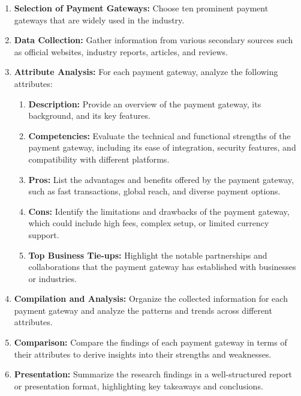 \begin{enumerate}
    \item\textbf{Selection of Payment Gateways:} Choose ten prominent payment gateways that are widely used in the industry.
    
    \item\textbf{Data Collection:} Gather information from various secondary sources such as official websites, industry reports, articles, and reviews.
    
    \item\textbf{Attribute Analysis:} For each payment gateway, analyze the following attributes:
    \begin{enumerate}
        \item\textbf{Description:} Provide an overview of the payment gateway, its background, and its key features.
        
        \item\textbf{Competencies:} Evaluate the technical and functional strengths of the payment gateway, including its ease of integration, security features, and compatibility with different platforms.
        
        \item\textbf{Pros:} List the advantages and benefits offered by the payment gateway, such as fast transactions, global reach, and diverse payment options.
        
        \item\textbf{Cons:} Identify the limitations and drawbacks of the payment gateway, which could include high fees, complex setup, or limited currency support.
        
        \item\textbf{Top Business Tie-ups:} Highlight the notable partnerships and collaborations that the payment gateway has established with businesses or industries.
    \end{enumerate}
    
    \item\textbf{Compilation and Analysis:} Organize the collected information for each payment gateway and analyze the patterns and trends across different attributes.
    
    \item\textbf{Comparison:} Compare the findings of each payment gateway in terms of their attributes to derive insights into their strengths and weaknesses.
    
    \item\textbf{Presentation:} Summarize the research findings in a well-structured report or presentation format, highlighting key takeaways and conclusions.
\end{enumerate}

